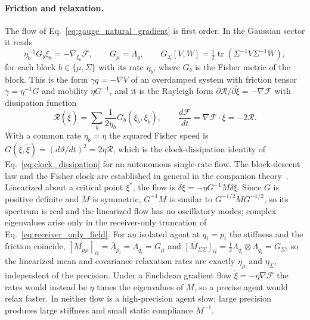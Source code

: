 \paragraph{Friction and relaxation.} The flow of Eq.~\eqref{eq:gauge_natural_gradient} is first order. In the Gaussian sector it reads
\begin{equation}
\eta_b^{-1}G_b\dot{\xi}_b = -\nabla_{\xi_b}\mathcal{F},
\qquad
G_\mu = \Lambda_q,
\qquad
G_\Sigma[V, W] = \tfrac12\operatorname{tr}(\Sigma^{-1}V\Sigma^{-1}W),
\label{eq:friction_form}
\end{equation}
for each block $b \in \{\mu, \Sigma\}$ with its rate $\eta_b$, where $G_b$ is the Fisher metric of the block. This is the form $\gamma\dot{q} = -\nabla V$ of an overdamped system with friction tensor $\gamma = \eta^{-1}G$ and mobility $\eta G^{-1}$, and it is the Rayleigh form $\partial\mathcal{R}/\partial\dot{\xi} = -\nabla\mathcal{F}$ with dissipation function
\begin{equation}
\mathcal{R}(\dot{\xi}) = \sum_b \frac{1}{2\eta_b}G_b(\dot{\xi}_b, \dot{\xi}_b),
\qquad
\frac{d\mathcal{F}}{dt} = \nabla\mathcal{F}\cdot\dot{\xi} = -2\mathcal{R}.
\label{eq:rayleigh_dissipation}
\end{equation}
With a common rate $\eta_b = \eta$ the squared Fisher speed is $G(\dot{\xi}, \dot{\xi}) = (d\vartheta/dt)^2 = 2\eta\mathcal{R}$, which is the clock-dissipation identity of Eq.~\eqref{eq:clock_dissipation} for an autonomous single-rate flow. The block-descent law and the Fisher clock are established in general in the companion theory~\cite[Chs.~7 and 8]{DennisGaugeVFE2026}. Linearized about a critical point $\xi^*$, the flow is $\delta\dot{\xi} = -\eta G^{-1}M\delta\xi$. Since $G$ is positive definite and $M$ is symmetric, $G^{-1}M$ is similar to $G^{-1/2}MG^{-1/2}$, so its spectrum is real and the linearized flow has no oscillatory modes; complex eigenvalues arise only in the receiver-only truncation of Eq.~\eqref{eq:receiver_only_field}. For an isolated agent at $q_i = p_i$ the stiffness and the friction coincide, $[M_{\mu\mu}]_{ii} = \bar{\Lambda}_{p_i} = \Lambda_{q_i} = G_\mu$ and $[M_{\Sigma\Sigma}]_{ii} = \tfrac12\Lambda_{q_i}\otimes\Lambda_{q_i} = G_\Sigma$, so the linearized mean and covariance relaxation rates are exactly $\eta_\mu$ and $\eta_\Sigma$, independent of the precision. Under a Euclidean gradient flow $\dot{\xi} = -\eta\nabla\mathcal{F}$ the rates would instead be $\eta$ times the eigenvalues of $M$, so a precise agent would relax faster. In neither flow is a high-precision agent slow; large precision produces large stiffness and small static compliance $M^{-1}$.

